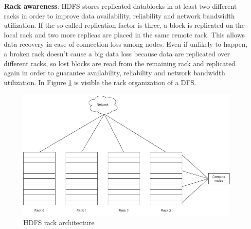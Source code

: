 \documentclass[\main/main.tex]{subfiles}
\begin{document}
\textbf{Rack awareness}: HDFS stores replicated datablocks in at least two different racks in order to improve data availability, reliability and network bandwidth utilization. If the so called replication factor is three, a block is replicated on the local rack and two more replicas are placed in the same remote rack. This allows data recovery in case of connection loss among nodes. Even if unlikely to happen, a broken rack doesn't cause a big data loss because data are replicated over different racks, so lost blocks are read from the remaining rack and replicated again in order to guarantee availability, reliability and network bandwidth utilization. In Figure \ref{fig:racks_dfs} is visible the rack organization of a DFS.
\begin{figure}[H]
    \centering
    \includegraphics[scale=0.35]{images/cluster_computing/racks_dfs.png}
    \caption{HDFS rack architecture}
    \label{fig:racks_dfs}
\end{figure}
\end{document}
